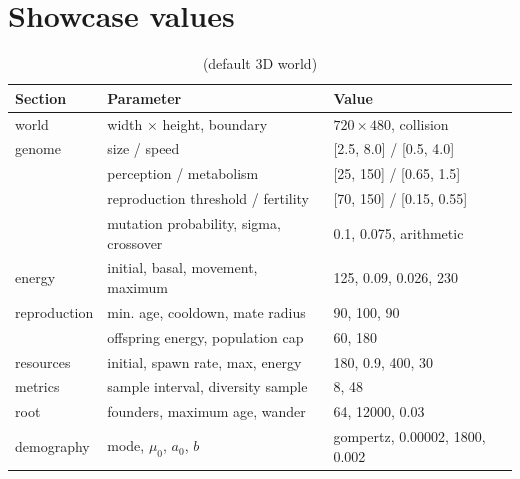 \section{Showcase values}
\begin{table}[htbp]
\centering
\caption{ (default 3D world)}
\begin{tabularx}{\textwidth}{lLl}
\toprule
Section & Parameter & Value \\
\midrule
world & width $\times$ height, boundary & $720\times480$, collision \\
genome & size / speed & [2.5, 8.0] / [0.5, 4.0] \\
 & perception / metabolism & [25, 150] / [0.65, 1.5] \\
 & reproduction threshold / fertility & [70, 150] / [0.15, 0.55] \\
 & mutation probability, sigma, crossover & 0.1, 0.075, arithmetic \\
energy & initial, basal, movement, maximum & 125, 0.09, 0.026, 230 \\
reproduction & min. age, cooldown, mate radius & 90, 100, 90 \\
 & offspring energy, population cap & 60, 180 \\
resources & initial, spawn rate, max, energy & 180, 0.9, 400, 30 \\
metrics & sample interval, diversity sample & 8, 48 \\
root & founders, maximum age, wander & 64, 12000, 0.03 \\
demography & mode, $\mu_0$, $a_0$, $b$ & gompertz, 0.00002, 1800, 0.002 \\
\bottomrule
\end{tabularx}
\end{table}

